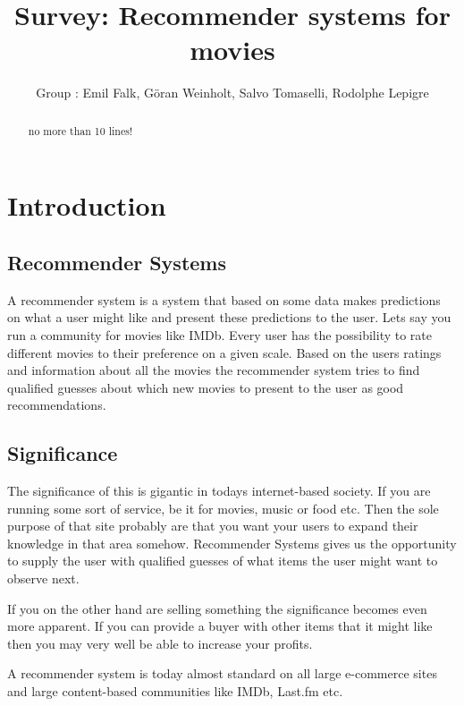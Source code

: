 \documentclass[a4paper,11pt]{report}
\begin{document}
\title{Survey: Recommender systems for movies}
\author{Group : Emil Falk, Göran Weinholt, Salvo Tomaselli, Rodolphe Lepigre}

\maketitle
\begin{abstract}\centering
no more than 10 lines!
\end{abstract}

\chapter{Introduction}
\section{Recommender Systems}
A recommender system is a system that based on some data makes predictions on what a user might
like and present these predictions to the user. Lets say you run a community for movies like IMDb.
Every user has the possibility to rate different movies to their preference on a given scale. Based
on the users ratings and information about all the movies the recommender system tries to find
qualified guesses about which new movies to present to the user as good recommendations.

\section{Significance}
The significance of this is gigantic in todays internet-based society. If you are running some sort 
of service, be it for movies, music or food etc. Then the sole purpose of that site probably are that
you want your users to expand their knowledge in that area somehow. Recommender Systems gives us the
opportunity to supply the user with qualified guesses of what items the user might want to observe next.

If you on the other hand are selling something the significance becomes even more apparent. If
you can provide a buyer with other items that it might like then you may very well be able to increase
your profits.

A recommender system is today almost standard on all large e-commerce sites and large content-based 
communities like IMDb, Last.fm etc.
\end{document}

